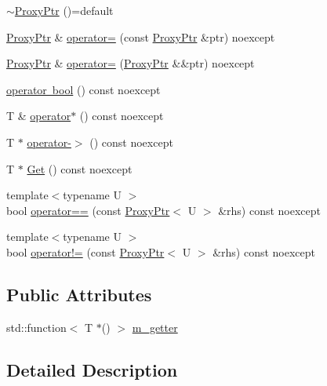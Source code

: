 \begin{DoxyCompactItemize}
\item 
\mbox{\hyperlink{classmage_1_1_proxy_ptr_a7f8989f9214bbc1cd94295c796cfbb9a}{$\sim$\+Proxy\+Ptr}} ()=default
\item 
\mbox{\hyperlink{classmage_1_1_proxy_ptr}{Proxy\+Ptr}} \& \mbox{\hyperlink{classmage_1_1_proxy_ptr_a2d3a3a7595028a72a97a2c2131947a8d}{operator=}} (const \mbox{\hyperlink{classmage_1_1_proxy_ptr}{Proxy\+Ptr}} \&ptr) noexcept
\item 
\mbox{\hyperlink{classmage_1_1_proxy_ptr}{Proxy\+Ptr}} \& \mbox{\hyperlink{classmage_1_1_proxy_ptr_a53e38a57d8155b8cd59b3d6e332995b7}{operator=}} (\mbox{\hyperlink{classmage_1_1_proxy_ptr}{Proxy\+Ptr}} \&\&ptr) noexcept
\item 
\mbox{\hyperlink{classmage_1_1_proxy_ptr_ac1226dcf54a735bb5da12273c38e9b8f}{operator bool}} () const noexcept
\item 
T \& \mbox{\hyperlink{classmage_1_1_proxy_ptr_aaf7b96ea7e8350ce5f2ae1f504627fd9}{operator$\ast$}} () const noexcept
\item 
T $\ast$ \mbox{\hyperlink{classmage_1_1_proxy_ptr_af33f20a43615df2328d7436ff3145d54}{operator-\/$>$}} () const noexcept
\item 
T $\ast$ \mbox{\hyperlink{classmage_1_1_proxy_ptr_a9af6f8e3b1f1aa9d5b323ed01fb9b40d}{Get}} () const noexcept
\item 
{\footnotesize template$<$typename U $>$ }\\bool \mbox{\hyperlink{classmage_1_1_proxy_ptr_a786d92c5d87ac0349a60cf99642bd890}{operator==}} (const \mbox{\hyperlink{classmage_1_1_proxy_ptr}{Proxy\+Ptr}}$<$ U $>$ \&rhs) const noexcept
\item 
{\footnotesize template$<$typename U $>$ }\\bool \mbox{\hyperlink{classmage_1_1_proxy_ptr_a14c1832a1f6b48c69337931d49bf3676}{operator!=}} (const \mbox{\hyperlink{classmage_1_1_proxy_ptr}{Proxy\+Ptr}}$<$ U $>$ \&rhs) const noexcept
\end{DoxyCompactItemize}
\subsection*{Public Attributes}
\begin{DoxyCompactItemize}
\item 
std\+::function$<$ T $\ast$() $>$ \mbox{\hyperlink{classmage_1_1_proxy_ptr_a78fad290d478eb55285d4ab01cda1669}{m\+\_\+getter}}
\end{DoxyCompactItemize}


\subsection{Detailed Description}
